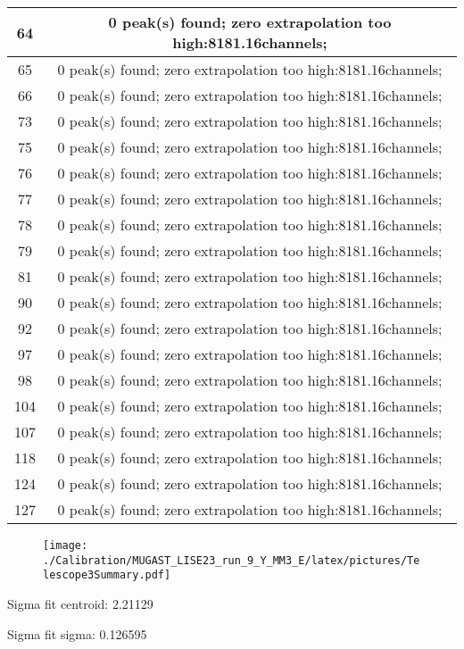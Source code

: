 \documentclass[a4paper,6pt]{article}
\begin{document}
\begin{center}
\begin{tabular}{ | c | c | }
64 &  0 peak(s) found; zero extrapolation too high:8181.16channels;  \\ \hline 
65 &  0 peak(s) found; zero extrapolation too high:8181.16channels;  \\ \hline 
66 &  0 peak(s) found; zero extrapolation too high:8181.16channels;  \\ \hline 
73 &  0 peak(s) found; zero extrapolation too high:8181.16channels;  \\ \hline 
75 &  0 peak(s) found; zero extrapolation too high:8181.16channels;  \\ \hline 
76 &  0 peak(s) found; zero extrapolation too high:8181.16channels;  \\ \hline 
77 &  0 peak(s) found; zero extrapolation too high:8181.16channels;  \\ \hline 
78 &  0 peak(s) found; zero extrapolation too high:8181.16channels;  \\ \hline 
79 &  0 peak(s) found; zero extrapolation too high:8181.16channels;  \\ \hline 
81 &  0 peak(s) found; zero extrapolation too high:8181.16channels;  \\ \hline 
90 &  0 peak(s) found; zero extrapolation too high:8181.16channels;  \\ \hline 
92 &  0 peak(s) found; zero extrapolation too high:8181.16channels;  \\ \hline 
97 &  0 peak(s) found; zero extrapolation too high:8181.16channels;  \\ \hline 
98 &  0 peak(s) found; zero extrapolation too high:8181.16channels;  \\ \hline 
104 &  0 peak(s) found; zero extrapolation too high:8181.16channels;  \\ \hline 
107 &  0 peak(s) found; zero extrapolation too high:8181.16channels;  \\ \hline 
118 &  0 peak(s) found; zero extrapolation too high:8181.16channels;  \\ \hline 
124 &  0 peak(s) found; zero extrapolation too high:8181.16channels;  \\ \hline 
127 &  0 peak(s) found; zero extrapolation too high:8181.16channels;  \\ \hline 
\end{tabular} 
\end{center}
\begin{figure}[htcb!]
\begin{center}
\texttt{[image: ./Calibration/MUGAST\_LISE23\_run\_9\_Y\_MM3\_E/latex/pictures/Telescope3Summary.pdf]}
\end{center}
\end{figure}
\pagebreak
Sigma fit centroid: 2.21129

Sigma fit sigma: 0.126595
\end{document}
